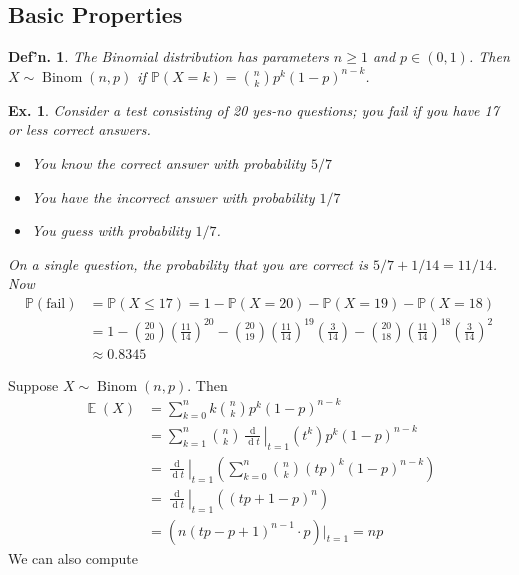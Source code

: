 \documentclass[12pt, a4paper]{book}
\DeclareMathOperator{\E}{\mathbb{E}}
\DeclareMathOperator{\Binom}{Binom}
\renewcommand{\Pr}{\mathbb{P}}
\renewcommand{\d}[1]{\ensuremath{\operatorname{d}\!{#1}}} %
\newtheorem{definition}[theorem]{Def'n.}
\newtheorem{example}[theorem]{Ex.}
\theoremstyle{nonumberplain}
\begin{document}
\subsection{Basic Properties}
\begin{definition}
    The Binomial distribution has parameters $n\geq 1$ and $p\in(0,1)$.
    Then $X\sim\Binom(n,p)$ if $\Pr(X=k)=\binom{n}{k}p^k(1-p)^{n-k}$.
\end{definition}
\begin{example}
    Consider a test consisting of 20 yes-no questions; you fail if you have 17 or less correct answers.
    \begin{itemize}[nolistsep]
        \item You know the correct answer with probability $5/7$
        \item You have the incorrect answer with probability $1/7$
        \item You guess with probability $1/7$.
    \end{itemize}
    On a single question, the probability that you are correct is $5/7+1/14=11/14$.
    Now
    \begin{align*}
        \Pr(\text{fail}) &= \Pr(X\leq 17) = 1-\Pr(X=20)-\Pr(X=19)-\Pr(X=18)\\
                         &= 1-\binom{20}{20}\left(\frac{11}{14}\right)^{20}-\binom{20}{19}\left(\frac{11}{14}\right)^{19}\left(\frac{3}{14}\right)-\binom{20}{18}\left(\frac{11}{14}\right)^{18}\left(\frac{3}{14}\right)^2\\
                         &\approx 0.8345
    \end{align*}
\end{example}
Suppose $X\sim\Binom(n,p)$.
Then
\begin{align*}
    \E(X) &= \sum\limits_{k=0}^nk\binom{n}{k}p^k(1-p)^{n-k}\\
          &= \sum\limits_{k=1}^n\binom{n}{k}\left.\frac{\d{}}{\d{t}}\right\rvert_{t=1}(t^k)p^k(1-p)^{n-k}\\
          &= \left.\frac{\d{}}{\d{t}}\right\rvert_{t=1}\left(\sum\limits_{k=0}^n\binom{n}{k}(tp)^k(1-p)^{n-k}\right)\\
          &= \left.\frac{\d{}}{\d{t}}\right\rvert_{t=1}\left((tp+1-p)^n\right)\\
          &= \left.\left(n(tp-p+1)^{n-1}\cdot p\right)\rvert_{t=1}=np
\end{align*}
We can also compute
\end{document}

